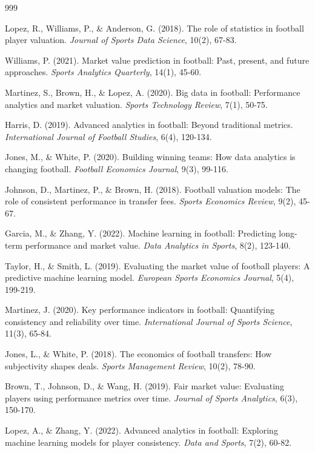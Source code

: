 \documentclass[12pt, a4paper,oneside]{book}
\numberwithin{equation}{section}
\begin{document}
\begin{thebibliography}{999}

Lopez, R., Williams, P., \& Anderson, G. (2018). The role of statistics in football player valuation. \textit{Journal of Sports Data Science}, 10(2), 67-83.

Williams, P. (2021). Market value prediction in football: Past, present, and future approaches. \textit{Sports Analytics Quarterly}, 14(1), 45-60.

Martinez, S., Brown, H., \& Lopez, A. (2020). Big data in football: Performance analytics and market valuation. \textit{Sports Technology Review}, 7(1), 50-75.

Harris, D. (2019). Advanced analytics in football: Beyond traditional metrics. \textit{International Journal of Football Studies}, 6(4), 120-134.

Jones, M., \& White, P. (2020). Building winning teams: How data analytics is changing football. \textit{Football Economics Journal}, 9(3), 99-116.

Johnson, D., Martinez, P., \& Brown, H. (2018). Football valuation models: The role of consistent performance in transfer fees. \textit{Sports Economics Review}, 9(2), 45-67.

Garcia, M., \& Zhang, Y. (2022). Machine learning in football: Predicting long-term performance and market value. \textit{Data Analytics in Sports}, 8(2), 123-140.

Taylor, H., \& Smith, L. (2019). Evaluating the market value of football players: A predictive machine learning model. \textit{European Sports Economics Journal}, 5(4), 199-219.

Martinez, J. (2020). Key performance indicators in football: Quantifying consistency and reliability over time. \textit{International Journal of Sports Science}, 11(3), 65-84.

Jones, L., \& White, P. (2018). The economics of football transfers: How subjectivity shapes deals. \textit{Sports Management Review}, 10(2), 78-90.

Brown, T., Johnson, D., \& Wang, H. (2019). Fair market value: Evaluating players using performance metrics over time. \textit{Journal of Sports Analytics}, 6(3), 150-170.

Lopez, A., \& Zhang, Y. (2022). Advanced analytics in football: Exploring machine learning models for player consistency. \textit{Data and Sports}, 7(2), 60-82.


\end{thebibliography}
\end{document}
